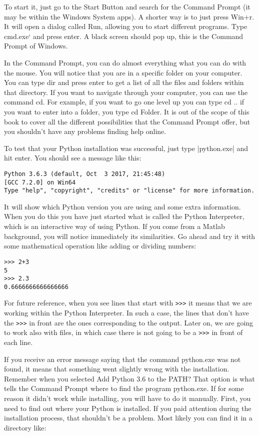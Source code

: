 To start it, just go to the Start Button and search for the Command Prompt (it may be within the Windows System apps). A shorter way is to just press Win+r. It will open a dialog called Run, allowing you to start different programs. Type cmd.exe` and press enter. A black screen should pop up, this is the Command Prompt of Windows.

In the Command Prompt, you can do almost everything what you can do with the mouse. You will notice that you are in a specific folder on your computer. You can type dir and press enter to get a list of all the files and folders within that directory. If you want to navigate through your computer, you can use the command cd. For example, if you want to go one level up you can type cd .. if you want to enter into a folder, you type cd Folder. It is out of the scope of this book to cover all the different possibilities that the Command Prompt offer, but you shouldn’t have any problems finding help online.

To test that your Python installation was successful, just type |python.exe| and hit enter. You should see a message like this:

\begin{verbatim}
Python 3.6.3 (default, Oct  3 2017, 21:45:48)
[GCC 7.2.0] on Win64
Type "help", "copyright", "credits" or "license" for more information.
\end{verbatim}

It will show which Python version you are using and some extra information. When you do this you have just started what is called the Python Interpreter, which is an interactive way of using Python. If you come from a Matlab background, you will notice immediately its similarities. Go ahead and try it with some mathematical operation like adding or dividing numbers:

\begin{verbatim}
>>> 2+3
5
>>> 2.3
0.6666666666666666
\end{verbatim}

For future reference, when you see lines that start with \texttt{>>>} it means that we are working within the Python Interpreter. In such a case, the lines that don’t have the \texttt{>>>} in front are the ones corresponding to the output. Later on, we are going to work also with files, in which case there is not going to be a \texttt{>>>} in front of each line.

If you receive an error message saying that the command python.exe was not found, it means that something went slightly wrong with the installation. Remember when you selected Add Python 3.6 to the PATH? That option is what tells the Command Prompt where to find the program python.exe. If for some reason it didn’t work while installing, you will have to do it manually. First, you need to find out where your Python is installed. If you paid attention during the installation process, that shouldn’t be a problem. Most likely you can find it in a directory like:

